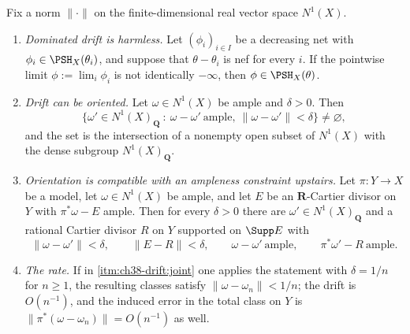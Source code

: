\begin{proposition}
\label{prop:ch38-drift-ledger}
Fix a norm $\|\cdot\|$ on the finite-dimensional real vector space
$N^1(X)$.
\begin{enumerate}
\item\label{itm:ch38-drift:dominated}
 \emph{Dominated drift is harmless.}  Let $(\phi_i)_{i\in I}$ be a
 decreasing net with $\phi_i\in\PSH_X(\theta_i)$, and suppose that
 $\theta-\theta_i$ is nef for every $i$.  If the pointwise limit
 $\phi:=\lim_i\phi_i$ is not identically $-\infty$, then
 $\phi\in\PSH_X(\theta)$.
\item\label{itm:ch38-drift:orient}
 \emph{Drift can be oriented.}  Let $\omega\in N^1(X)$ be ample and
 $\delta>0$.  Then
\[
 \bigl\{\omega'\in N^1(X)_{\mathbf Q}\ :\
 \omega-\omega'\ \text{ample},\ \|\omega-\omega'\|<\delta\bigr\}
 \neq\varnothing,
\tag{38.20}\label{eq:ch38-drift-orientable}
\]
 and the set is the intersection of a nonempty open subset of
 $N^1(X)$ with the dense subgroup $N^1(X)_{\mathbf Q}$.
\item\label{itm:ch38-drift:joint}
 \emph{Orientation is compatible with an ampleness constraint upstairs.}
 Let $\pi:Y\to X$ be a model, let $\omega\in N^1(X)$ be ample, and let
 $E$ be an $\mathbf R$-Cartier divisor on $Y$ with
 $\pi^*\omega-E$ ample.  Then for every $\delta>0$ there are
 $\omega'\in N^1(X)_{\mathbf Q}$ and a rational Cartier divisor $R$ on
 $Y$ supported on $\Supp E$ with
\[
 \|\omega-\omega'\|<\delta,\qquad
 \|E-R\|<\delta,\qquad
 \omega-\omega'\ \text{ample},\qquad
 \pi^*\omega'-R\ \text{ample}.
\tag{38.21}\label{eq:ch38-drift-joint}
\]
\item\label{itm:ch38-drift:rate}
 \emph{The rate.}  If in \cref{itm:ch38-drift:joint} one applies the
 statement with $\delta=1/n$ for $n\geq1$, the resulting classes
 satisfy $\|\omega-\omega_n\|<1/n$; the drift is $O(n^{-1})$, and the
 induced error in the total class on $Y$ is
 $\|\pi^*(\omega-\omega_n)\|=O(n^{-1})$ as well.
\end{enumerate}
\end{proposition}

